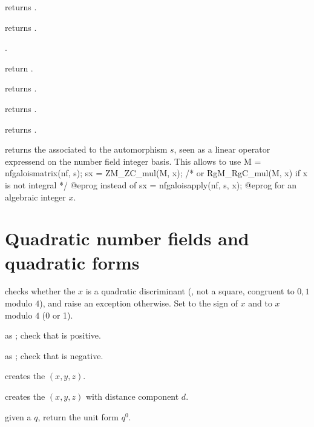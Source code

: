  returns .

 returns .

 .

 return .

 returns .

 returns .

 returns .


 returns the  associated to
the automorphism $s$, seen as a linear operator expressend on the number
field integer basis. This allows to use
\bprog
  M = nfgaloismatrix(nf, s);
  sx = ZM_ZC_mul(M, x);   /* or RgM_RgC_mul(M, x) if x is not integral */
@eprog\noindent
instead of
\bprog
  sx = nfgaloisapply(nf, s, x);
@eprog\noindent
for an algebraic integer $x$.

\section{Quadratic number fields and quadratic forms}


checks whether the  $x$ is a quadratic discriminant (,
not a square, congruent to $0,1$ modulo $4$), and raise an exception
otherwise. Set  to the sign of $x$ and  to $x$ modulo
$4$ (0 or 1).

 as
; check that  is positive.

 as
; check that  is negative.


 creates the  $(x,y,z)$.

 creates the  $(x,y,z)$
with distance component $d$.

 given a  $q$, return the unit form $q^0$.

